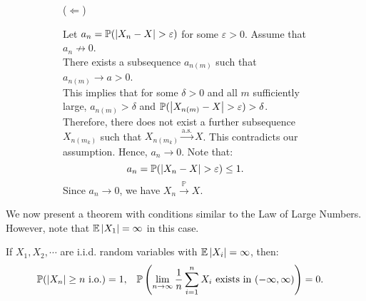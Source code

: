 \documentclass{huhtakm-template-book-v2}
\newcommand{\prob}{\mathbb{P}}
\newcommand{\expect}{\mathbb{E}}
\begin{document}
\begin{proofing}
\begin{figure}[h!]
\begin{subfigure}[t]{0.9\textwidth}
\begin{equation*}
                \end{equation*}
            \end{subfigure}
        \end{figure}
        \begin{figure}[h!]
            \begin{subfigure}[b]{0.05\textwidth}
                ($\Longleftarrow$)
            \end{subfigure}
            \begin{subfigure}[t]{0.9\textwidth}
                Let $a_{n} = \prob(\abs{X_{n}-X} > \varepsilon)$ for some $\varepsilon > 0$. Assume that $a_{n} \not\to 0$.\\
                There exists a subsequence $a_{n(m)}$ such that $a_{n(m)} \to a > 0$.\\
                This implies that for some $\delta > 0$ and all $m$ sufficiently large, $a_{n(m)} > \delta$ and $\prob(\abs{X_{n(m)}-X} > \varepsilon) > \delta$.\\
                Therefore, there does not exist a further subsequence $X_{n(m_{k})}$ such that $X_{n(m_{k})} \xrightarrow{\text{a.s.}} X$. This contradicts our assumption. Hence, $a_{n} \to 0$. Note that:
                \begin{equation*}
                    a_{n} = \prob(\abs{X_{n}-X} > \varepsilon) \leq 1.
                \end{equation*}
                Since $a_{n} \to 0$, we have $X_{n} \xrightarrow{\prob} X$.
            \end{subfigure}
        \end{figure}
    \end{proofing}
    We now present a theorem with conditions similar to the Law of Large Numbers. However, note that $\expect\abs{X_{1}} = \infty$ in this case.
    \begin{thm}
        If $X_{1},X_{2},\cdots$ are i.i.d. random variables with $\expect\abs{X_{i}} = \infty$, then:
        \begin{align*}
            \prob(\abs{X_{n}} \geq n\text{ i.o.}) &= 1, & \prob\left(\lim_{n \to \infty}\frac{1}{n}\sum_{i = 1}^{n}X_{i}\text{ exists in }(-\infty,\infty)\right) &= 0.
        \end{align*}
    \end{thm}
\end{document}
